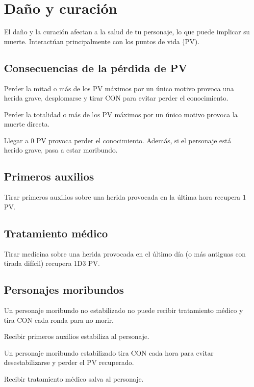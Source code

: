 \section{Daño y curación}

El daño y la curación afectan a la salud de tu personaje, lo que puede implicar su muerte. Interactúan principalmente con los puntos de vida (PV).

\subsection{Consecuencias de la pérdida de PV}

Perder la mitad o más de los PV máximos por un único motivo provoca una herida grave, desplomarse y tirar CON para evitar perder el conocimiento.

Perder la totalidad o más de los PV máximos por un único motivo provoca la muerte directa.

Llegar a 0 PV provoca perder el conocimiento. Además, si el personaje está herido grave, pasa a estar moribundo.

\subsection{Primeros auxilios}

Tirar primeros auxilios sobre una herida provocada en la última hora recupera 1 PV.

\subsection{Tratamiento médico}

Tirar medicina sobre una herida provocada en el último día (o más antiguas con tirada difícil) recupera 1D3 PV.

\subsection{Personajes moribundos}

Un personaje moribundo no estabilizado no puede recibir tratamiento médico y tira CON cada ronda para no morir.

Recibir primeros auxilios estabiliza al personaje.

Un personaje moribundo estabilizado tira CON cada hora para evitar desestabilizarse y perder el PV recuperado.

Recibir tratamiento médico salva al personaje.

